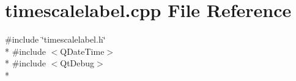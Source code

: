 \section{timescalelabel.\+cpp File Reference}
\label{scalelabels_2timescalelabel_8cpp}
{\ttfamily \#include \char`\"{}timescalelabel.\+h\char`\"{}}\\*
{\ttfamily \#include $<$Q\+Date\+Time$>$}\\*
{\ttfamily \#include $<$Qt\+Debug$>$}\\*

